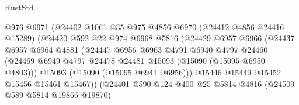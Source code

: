 \begin{lexlean}{RustStd}
\begin{coremodule}
                                    @976
                                    @6971
                                    (@24402
                                      @1061
                                      @35
                                      @975
                                      @4856
                                      @6970
                                      (@24412 @4856 @24416 @15289)
                                      (@24420
                                        @592
                                        @22
                                        @974
                                        @6968
                                        @5816
                                        (@24429
                                          @6957
                                          @6966
                                          (@24437
                                            @6957
                                            @6964
                                            @4881
                                            (@24447
                                              @6956
                                              @6963
                                              @4791
                                              @6940
                                              @4797
                                              @24460
                                              (@24469
                                                @6949
                                                @4797
                                                @24478
                                                @24481
                                                @15093
                                                (@15090 (@15095 @6950 @4803)))
                                              @15093
                                              (@15090 (@15095 @6941 @6956)))
                                            @15446
                                            @15449
                                            @15452
                                            @15456
                                            @15461
                                            @15467))
                                        (@24401
                                          @590
                                          @124
                                          @400
                                          @25
                                          @5814
                                          @4816
                                          (@24509 @589 @5814 @19866 @19870)

\end{coremodule}
\end{lexlean}
